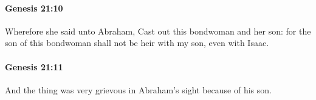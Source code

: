 		\paragraph{Genesis 21:10} %
			\label{GENESIS-21-10}

			Wherefore she said unto Abraham, Cast out this bondwoman and her son: for the son of this bondwoman shall not be heir with my son, even with Isaac.


		\paragraph{Genesis 21:11} %
			\label{GENESIS-21-11}

			And the thing was very grievous in Abraham's sight because of his son.


